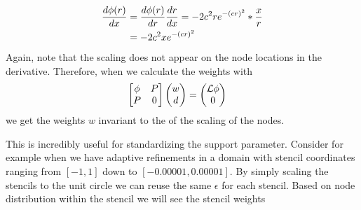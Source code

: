 \documentclass{report}
\begin{document}
\begin{align}
\frac{d \phi(r)}{d x} & = \frac{d \phi(r)}{d r} \frac{d r}{d x} = -2 c^2 r e^{-(c r)^2} * \frac{x}{r} \\
& = -2 c^2 x e^{-(c r)^2}
\end{align}
Again, note that the scaling does not appear on the node locations in the derivative. Therefore, when we calculate the weights with 
\begin{align}
\begin{bmatrix} \phi & P \\ P & 0 \end{bmatrix} \begin{pmatrix} w \\ d \end{pmatrix} & = \begin{pmatrix} \mathcal{L}\phi \\ 0 \end{pmatrix}
\end{align}
we get the weights $w$ invariant to the of the scaling of the nodes. 

This is incredibly useful for standardizing the support parameter. Consider for example when we have adaptive refinements in a domain with stencil coordinates ranging from $[-1,1]$ down to $[-0.00001, 0.00001]$. By simply scaling the stencils to the unit circle we can reuse the same $\epsilon$ for each stencil. Based on node distribution within the stencil we will see the stencil weights 


\ifstandalone


\end{document}
